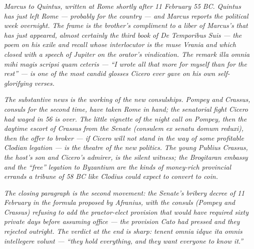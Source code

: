 
\textit{Marcus to Quintus, written at Rome shortly after 11
February 55 BC. Quintus has just left Rome --- probably for
the country --- and Marcus reports the political week
overnight. The frame is the brother's compliment to a
\textit{liber} of Marcus's that has just appeared, almost
certainly the third book of \textit{De Temporibus Suis} --- the
poem on his exile and recall whose interlocutor is the muse
\textit{Vrania} and which closed with a speech of Jupiter on
the orator's vindication. The remark \textit{illa omnia mihi
magis scripsi quam ceteris} --- ``I wrote all that more for
myself than for the rest'' --- is one of the most candid
glosses Cicero ever gave on his own self-glorifying verses.}

\textit{The substantive news is the working of the new
consulships. Pompey and Crassus, consuls for the second time,
have taken Rome in hand; the senatorial fight Cicero had
waged in 56 is over. The little vignette of the night call
on Pompey, then the daytime escort of Crassus from the Senate
\textit{(consulem ex senatu domum reduxi)}, then the offer
to broker --- if Cicero will not stand in the way of some
profitable Clodian legation --- is the theatre of the new
politics. The young Publius Crassus, the host's son and
Cicero's admirer, is the silent witness; the Brogitaran
embassy and the ``free'' legation to Byzantium are the kinds
of money-rich provincial errands a tribune of 58 BC like
Clodius could expect to convert to coin.}

\textit{The closing paragraph is the second movement: the
Senate's bribery decree of 11 February in the formula
proposed by Afranius, with the consuls (Pompey and Crassus)
refusing to add the praetor-elect provision that would have
required sixty private days before assuming office --- the
provision Cato had pressed and they rejected outright. The
verdict at the end is sharp: \textit{tenent omnia idque ita
omnis intellegere volunt} --- ``they hold everything, and
they want everyone to know it.''}
